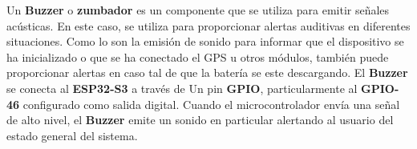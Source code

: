             Un \textbf{Buzzer} o \textbf{zumbador} es un componente que se utiliza para emitir señales acústicas. En este caso, se utiliza para proporcionar alertas auditivas en diferentes situaciones. Como lo son la emisión de sonido para informar que el dispositivo se ha inicializado o que se ha conectado el GPS u otros módulos, también puede proporcionar alertas en caso tal de que la batería se este descargando.
            \vspace{5 px}
            El \textbf{Buzzer} se conecta al \textbf{ESP32-S3} a través de Un pin \textbf{GPIO}, particularmente al \textbf{GPIO-46}  configurado como salida digital. Cuando el microcontrolador envía una señal de alto nivel, el \textbf{Buzzer} emite un sonido en particular alertando al usuario del estado general del sistema.
            \vspace{5 px}

